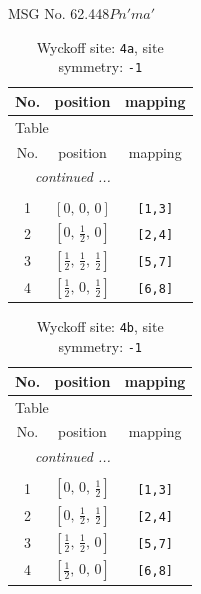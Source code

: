 \documentclass[fleqn,8pt]{jsarticle}
\begin{document}
\setcounter{MaxMatrixCols}{32}

\renewcommand{\tablename}{Table~}
\renewcommand{\figurename}{Figure~}
\begin{center}
\LARGE
MSG No. 62.448\quad$Pn'ma'$
\end{center}
\renewcommand{\arraystretch}{1.2}
\begin{longtable}{ccc}
\caption{Wyckoff site: {\tt 4a}, site symmetry: {\tt -1}}
 \\
 \hline \hline
No. & position & mapping \\ \hline \endfirsthead

\multicolumn{2}{l}{\tablename\ \thetable{}} \\
 \hline \hline
No. & position & mapping \\ \hline \endhead

 \hline \hline
\multicolumn{2}{r}{\footnotesize\it continued ...} \\ \endfoot

 \hline \hline
\multicolumn{2}{r}{} \\ \endlastfoot

1 & $\left[ 0,\, 0,\, 0 \right]$ & {\tt [1,3]} \\ \hline
2 & $\left[ 0,\, \frac{1}{2},\, 0 \right]$ & {\tt [2,4]} \\ \hline
3 & $\left[ \frac{1}{2},\, \frac{1}{2},\, \frac{1}{2} \right]$ & {\tt [5,7]} \\ \hline
4 & $\left[ \frac{1}{2},\, 0,\, \frac{1}{2} \right]$ & {\tt [6,8]} \\
\end{longtable}
\renewcommand{\arraystretch}{1.2}
\begin{longtable}{ccc}
\caption{Wyckoff site: {\tt 4b}, site symmetry: {\tt -1}}
 \\
 \hline \hline
No. & position & mapping \\ \hline \endfirsthead

\multicolumn{2}{l}{\tablename\ \thetable{}} \\
 \hline \hline
No. & position & mapping \\ \hline \endhead

 \hline \hline
\multicolumn{2}{r}{\footnotesize\it continued ...} \\ \endfoot

 \hline \hline
\multicolumn{2}{r}{} \\ \endlastfoot

1 & $\left[ 0,\, 0,\, \frac{1}{2} \right]$ & {\tt [1,3]} \\ \hline
2 & $\left[ 0,\, \frac{1}{2},\, \frac{1}{2} \right]$ & {\tt [2,4]} \\ \hline
3 & $\left[ \frac{1}{2},\, \frac{1}{2},\, 0 \right]$ & {\tt [5,7]} \\ \hline
4 & $\left[ \frac{1}{2},\, 0,\, 0 \right]$ & {\tt [6,8]} \\
\end{longtable}
\end{document}
